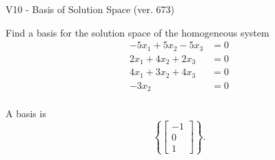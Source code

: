 \begin{exercise}
  \begin{exerciseTitle}V10 - Basis of Solution Space (ver. 673)\end{exerciseTitle}
  \begin{exerciseStatement}
    Find a basis for the solution space of the homogeneous system 
\begin{align*}
 -5 x_ 1 + 5 x_ 2 -5 x_ 3 &= 0  \\ 
  2 x_ 1 + 4 x_ 2 + 2 x_ 3 &= 0  \\ 
  4 x_ 1 + 3 x_ 2 + 4 x_ 3 &= 0  \\ 
  -3 x_ 2 &= 0  \\ 
 \end{align*}


 
  \end{exerciseStatement}

  \begin{exerciseAnswer}
   A basis is   
\[\left\{\left[\begin{array}{c}
-1 \\
0 \\
1
\end{array}\right]\right\}.\]

  


  \end{exerciseAnswer}
\end{exercise}